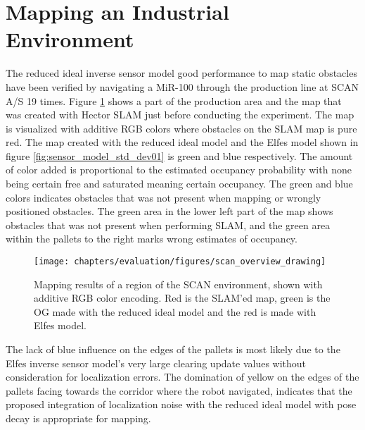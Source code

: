 \section{Mapping an Industrial Environment}
\label{sec:mapping_at_scan}
The reduced ideal inverse sensor model good performance to map static obstacles have been verified by navigating a MiR-100 through the production line at SCAN A/S 19 times.
Figure \ref{fig:scan_overview_drawing} shows a part of the production area and the map that was created with Hector SLAM \cite{hector_slam} just before conducting the experiment.
The map is visualized with additive RGB colors where obstacles on the SLAM map is pure red. 
The map created with the reduced ideal model and the Elfes model shown in figure \ref{fig:sensor_model_std_dev01} is green and blue respectively.
The amount of color added is proportional to the estimated occupancy probability with none being certain free and saturated meaning certain occupancy. 
The green and blue colors indicates obstacles that was not present when mapping or wrongly positioned obstacles.
The green area in the lower left part of the map shows obstacles that was not present when performing SLAM, and the green area within the pallets to the right marks wrong estimates of occupancy.

\begin{figure}
    \centering
    \texttt{[image: chapters/evaluation/figures/scan\_overview\_drawing]}
    \caption{Mapping results of a region of the SCAN environment, shown with additive RGB color encoding. Red is the SLAM'ed map, green is the OG made with the reduced ideal model and the red is made with Elfes model.}
    \label{fig:scan_overview_drawing}
\end{figure}

The lack of blue influence on the edges of the pallets is most likely due to the Elfes inverse sensor model's very large clearing update values without consideration for localization errors.
The domination of yellow on the edges of the pallets facing towards the corridor where the robot navigated, indicates that the proposed integration of localization noise with the reduced ideal model with pose decay is appropriate for mapping. 
